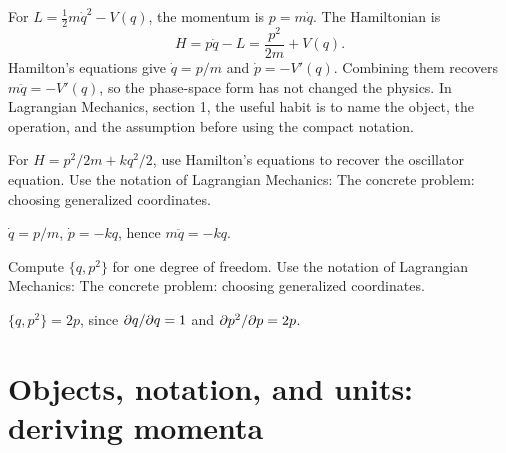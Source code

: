 \begin{example}
For \(L=\frac12m\dot q^2-V(q)\), the momentum is \(p=m\dot q\).  The Hamiltonian is
\[
  H=p\dot q-L=\frac{p^2}{2m}+V(q).
\]
Hamilton's equations give \(\dot q=p/m\) and \(\dot p=-V'(q)\).  Combining them recovers \(m\ddot q=-V'(q)\), so the phase-space form has not changed the physics.  In Lagrangian Mechanics, section 1, the useful habit is to name the object, the operation, and the assumption before using the compact notation.
\end{example}



\begin{exercise}
For \(H=p^2/2m+kq^2/2\), use Hamilton's equations to recover the oscillator equation.  Use the notation of Lagrangian Mechanics: The concrete problem: choosing generalized coordinates.
\begin{answer}
\(\dot q=p/m\), \(\dot p=-kq\), hence \(m\ddot q=-kq\).
\end{answer}
\end{exercise}

\begin{exercise}
Compute \(\{q,p^2\}\) for one degree of freedom.  Use the notation of Lagrangian Mechanics: The concrete problem: choosing generalized coordinates.
\begin{answer}
\(\{q,p^2\}=2p\), since \(\partial q/\partial q=1\) and \(\partial p^2/\partial p=2p\).
\end{answer}
\end{exercise}



\section{Objects, notation, and units: deriving momenta}













